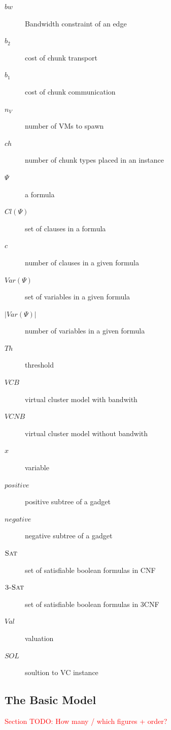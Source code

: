 \documentclass[9pt,twocolumn]{scrartcl}
\newcommand{\carlo}[1]{\textcolor{red}{#1}}
\newcommand{\Bandwidth}{\ensuremath{bw}}
\newcommand{\CostCom}{\ensuremath{b_1}}
\newcommand{\CostTrans}{\ensuremath{b_2}}
\newcommand{\Vms}{\ensuremath{n_V}}
\newcommand{\TSAT}{\textsc{3-Sat}}
\newcommand{\SAT}{\textsc{Sat}}
\newcommand{\Formula}{\ensuremath{\Psi}}
\newcommand{\Clauses}{\ensuremath{Cl(\Formula)}}
\newcommand{\NClauses}{\ensuremath{c}}
\newcommand{\Vars}{\ensuremath{Var(\Formula)}}
\newcommand{\NVars}{\ensuremath{|\Vars|}}
\newcommand{\ChunkTypes}{\ensuremath{ch}}
\newcommand{\Thr}{\ensuremath{Th}}
\newcommand{\VCB}{\ensuremath{VCB}}
\newcommand{\VCNB}{\ensuremath{VCNB}}
\newcommand{\varx}{\ensuremath{x}}
\newcommand{\positive}{\ensuremath{positive}}
\newcommand{\negative}{\ensuremath{negative}}
\newcommand{\Val}{\ensuremath{Val}}
\newcommand{\Sol}{\ensuremath{SOL}}
\begin{document}
\begin{appendix}
\begin{description}
 \item [$\Bandwidth$] Bandwidth constraint of an edge
 \item [$\CostTrans$] cost of chunk transport
 \item [$\CostCom$] cost of chunk communication
 \item [$\Vms$] number of VMs to spawn
 \item [$\ChunkTypes$] number of chunk types placed in an instance
 \item [$\Formula$] a formula
 \item [$\Clauses$] set of clauses in a formula
 \item [$\NClauses$] number of clauses in a given formula
 \item [$\Vars$] set of variables in a given formula
 \item [$\NVars$] number of variables in a given formula
 \item [$\Thr$] threshold
 \item [$\VCB$] virtual cluster model with bandwith
 \item [$\VCNB$] virtual cluster model without bandwith
 \item [$\varx$] variable
 \item [$\positive$] positive subtree of a gadget
 \item [$\negative$] negative subtree of a gadget
 \item [$\SAT$] set of satisfiable boolean formulas in CNF
 \item [$\TSAT$] set of satisfiable boolean formulas in 3CNF
 \item [$\Val$] valuation
 \item [$\Sol$] soultion to VC instance

\end{description}



\subsection{The Basic Model}

\carlo{Section TODO: How many / which figures + order?}


\end{appendix}
\end{document}
